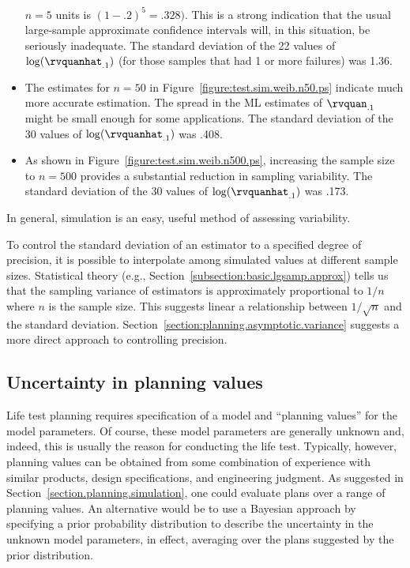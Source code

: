 \begin{example}
\begin{itemize}
$n=5$ units is $(1-.2)^{5}=.328)$. This is a strong indication that the
usual large-sample approximate confidence intervals will, in this situation,  
be seriously inadequate. The standard deviation of the 22 values of 
$\log(\rvquanhat_{.1})$
(for those samples that had 1 or more failures) was 1.36.
\item
The estimates for $n=50$ in Figure~\ref{figure:test.sim.weib.n50.ps}
indicate much more accurate estimation.  The spread in the ML
estimates of $\rvquan_{.1}$  might be small enough
for some applications. The standard deviation of the
30 values of $\log(\rvquanhat_{.1})$ was .408.
\item
As shown in Figure~\ref{figure:test.sim.weib.n500.ps}, increasing
the sample size to $n=500$ provides a substantial reduction in
sampling variability. The standard deviation of the 30 values of
$\log(\rvquanhat_{.1})$ was .173.
\end{itemize}
In general, simulation is an easy, useful method of assessing variability.
\end{example}

To control the standard deviation of an estimator to a specified
degree of precision, it is possible to interpolate among simulated
values at different sample sizes. Statistical theory (e.g.,
Section~\ref{subsection:basic.lgsamp.approx}) tells us that the
sampling variance of estimators is approximately proportional to
$1/n$ where $n$ is the sample size.  This suggests linear a
relationship between $1/\sqrt{n}$ and the standard deviation.
Section~\ref{section:planning.asymptotic.variance} suggests a more
direct approach to controlling precision.

\subsection{Uncertainty in planning values}
Life test planning requires specification of a
model and ``planning values'' for the model parameters. Of course, these
model parameters are generally unknown and, indeed, this is usually
the reason for conducting the life test. Typically, however, planning
values can be obtained from some combination of experience with
similar products, design specifications, and engineering judgment. As
suggested in Section~\ref{section.planning.simulation}, one could
evaluate plans over a range of planning
values.  An alternative would be to use a Bayesian approach
by specifying a prior probability distribution to describe the
uncertainty in the unknown model parameters, in effect, averaging over
the plans suggested by the prior distribution.
